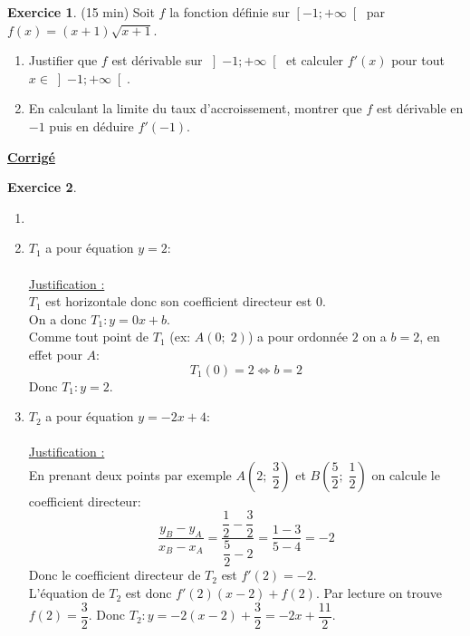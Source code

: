 \documentclass{exam}
\theoremstyle{definition}
\newtheorem{exercice}{Exercice}
\begin{document}
\begin{exercice}{(15 min)}
    Soit $f$ la fonction définie sur $\left[-1; +\infty\right[$ par $f(x) = (x+1)\sqrt{x+1}$.
    \begin{enumerate}
        \item Justifier que $f$ est dérivable sur $\left]-1; +\infty\right[$ et calculer $f'(x)$ pour tout $x \in \left]-1; +\infty\right[$.
        \item En calculant la limite du taux d'accroissement, montrer que $f$ est dérivable en $-1$ puis en déduire $f'(-1)$.
    \end{enumerate}
    \end{exercice}
    
\newpage

\begin{center}
    \LARGE
    \textbf{\underline{Corrigé}}
\end{center}
\setcounter{exercice}{0}

\begin{exercice}
    \begin{enumerate}
        \item[]
        \item $T_1$ a pour équation $y = 2$:\\
        \\
        \underline{Justification :}\\
        $T_1$ est horizontale donc son coefficient directeur est $0$.\\
        On a donc $T_1: y = 0x + b$.\\
        Comme tout point de $T_1$ (ex: $A(0;\; 2)$) a pour ordonnée $2$ on a $b = 2$, en effet pour $A$:
        $$
            T_1(0) = 2 \iff b = 2
        $$
        Donc $T_1: y = 2$.
        \item $T_2$ a pour équation $y = -2x + 4$:\\
        \\
        \underline{Justification :}\\
        En prenant deux points par exemple $A\left(2;\; \dfrac{3}{2}\right)$ et $B\left(\dfrac{5}{2};\; \dfrac{1}{2}\right)$ on calcule le coefficient directeur:
        $$
            \frac{y_B - y_A}{x_B - x_A} = \dfrac{\dfrac{1}{2} - \dfrac{3}{2}}{\dfrac{5}{2} - 2} = \dfrac{1-3}{5 - 4} = -2
        $$
        Donc le coefficient directeur de $T_2$ est $f'(2) = -2$.\\
        L'équation de $T_2$ est donc $f'(2)(x-2) + f(2)$. Par lecture on trouve $f(2) = \dfrac{3}{2}$.
        Donc $T_2: y = -2(x-2) + \dfrac{3}{2} = -2x + \dfrac{11}{2}$.
    \end{enumerate}
\end{exercice}
\end{document}
